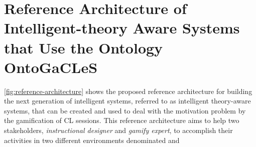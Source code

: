 
 



\section[Reference Architecture of Intelligent-theory Aware Systems]{Reference Architecture of Intelligent-theory Aware Systems that Use the Ontology OntoGaCLeS}
\label{sec:reference-architecture}

\autoref{fig:reference-architecture} shows the proposed reference architecture for building the next generation of intelligent systems, referred to as intelligent theory-aware systems, that can be created and used to deal with the motivation problem by the gamification of CL sessions. This reference architecture aims to help two stakeholders, \emph{instructional designer} and \emph{gamify expert}, to accomplish their activities in two different environments denominated  and 


